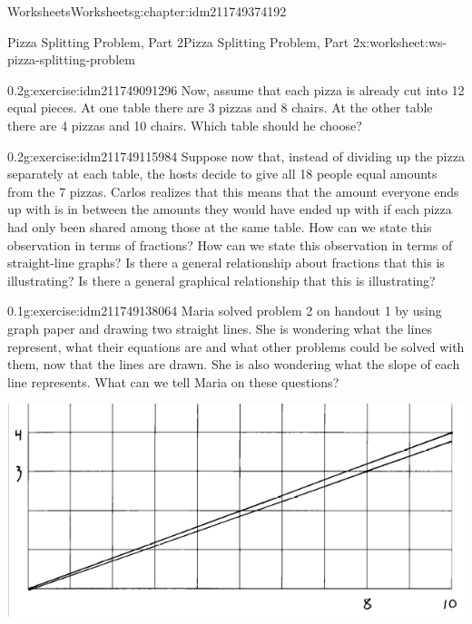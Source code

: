 \documentclass[twoside,11pt,]{book}
\begin{document}
\begin{chapterptx}{Worksheets}{}{Worksheets}{}{}{g:chapter:idm211749374192}
\begin{worksheet-section-numberless}{Pizza Splitting Problem, Part 2}{}{Pizza Splitting Problem, Part 2}{}{}{x:worksheet:ws-pizza-splitting-problem}
\begin{divisionexercise}{1}{}{0.2}{g:exercise:idm211749091296}%
Now, assume that each pizza is already cut into 12 equal pieces. At one table there are 3 pizzas and 8 chairs.  At the other table there are 4 pizzas and 10 chairs.  Which table should he choose?%
\end{divisionexercise}%
\begin{divisionexercise}{2}{}{0.2}{g:exercise:idm211749115984}%
Suppose now that, instead of dividing up the pizza separately at each table, the hosts decide to give all 18 people equal amounts from the 7 pizzas.  Carlos realizes that this means that the amount everyone ends up with is in between the amounts they would have ended up with if each pizza had only been shared among those at the same table.  How can we state this observation in terms of fractions?  How can we state this observation in terms of straight-line graphs?  Is there a general relationship about fractions that this is illustrating?  Is there a general graphical relationship that this is illustrating?%
\end{divisionexercise}%
\clearpage
\begin{divisionexercise}{3}{}{0.1}{g:exercise:idm211749138064}%
Maria solved problem 2 on handout 1 by using graph paper and drawing two straight lines.  She is wondering what the lines represent, what their equations are and what other problems could be solved with them, now that the lines are drawn.  She is also wondering what the slope of each line represents.  What can we tell Maria on these questions?%
\begin{sidebyside}{1}{0.05}{0.05}{0}%
\begin{sbspanel}{0.9}%
\includegraphics[width=1\linewidth]{images/pizza-splitting-problem.png}

\end{sbspanel}
\end{sidebyside}
\end{divisionexercise}
\end{worksheet-section-numberless}
\end{chapterptx}
\end{document}
